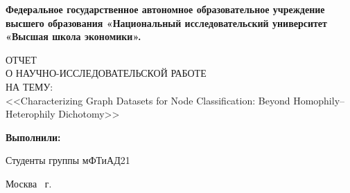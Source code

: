 \begin{titlepage}

    \begin{center}
        \textbf{Федеральное государственное автономное образовательное
        	учреждение высшего образования 
        	«Национальный исследовательский университет 
        	«Высшая школа экономики».
        }
    
	\end{center}

\vfill
	
	\begin{center}

        ОТЧЕТ \\
        	О НАУЧНО-ИССЛЕДОВАТЕЛЬСКОЙ РАБОТЕ \\
        	НА ТЕМУ:\\
        	<<Characterizing Graph Datasets for Node Classification:
        	Beyond Homophily–Heterophily Dichotomy>>
        


    \end{center}

    \vfill


    \begin{flushright}
        \textbf{Выполнили:}

        \vspace{2ex}

        Студенты группы мФТиАД21

        \vspace{2ex}
        
    \end{flushright}

    \vspace{5ex}
    \begin{center}
        Москва \the\year \, г.
    \end{center}

\end{titlepage}
\addtocounter{page}{1}